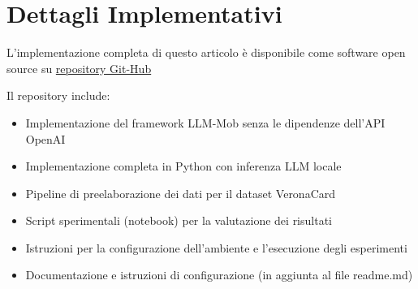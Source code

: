 \chapter{Dettagli Implementativi}

L'implementazione completa di questo articolo è disponibile come software open source su \href{https://github.com/simo-hue/LLM-Mob-As-Mobility-Interpreter.git}{repository Git-Hub}

Il repository include:
\begin{itemize}
\item Implementazione del framework LLM-Mob senza le dipendenze dell'API OpenAI
\item Implementazione completa in Python con inferenza LLM locale
\item Pipeline di preelaborazione dei dati per il dataset VeronaCard
\item Script sperimentali (notebook) per la valutazione dei risultati
\item Istruzioni per la configurazione dell'ambiente e l'esecuzione degli esperimenti
\item Documentazione e istruzioni di configurazione (in aggiunta al file readme.md)
\end{itemize}
